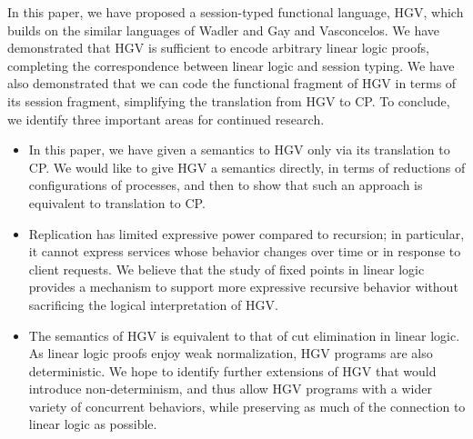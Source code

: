 \documentclass{easychair}
\newcommand{\key}{\mathsf}
\newcommand{\gvInputType}[2]{?[{#1}].{#2}}
\newcommand{\gvj}[3]{{#1} \vdash {#2} : {#3}}
\newcommand{\gvSendType}[2]{\key{sendType}~{#1}~{#2}}
\newcommand{\hgv}{HGV\xspace}
\begin{document}
In this paper, we have proposed a session-typed functional language, \hgv, which builds on the
similar languages of Wadler and Gay and Vasconcelos.  We have demonstrated that \hgv is sufficient
to encode arbitrary linear logic proofs, completing the correspondence between linear logic and
session typing.  We have also demonstrated that we can code the functional fragment of \hgv in terms
of its session fragment, simplifying the translation from \hgv to CP.  To conclude, we identify
three important areas for continued research.
\begin{itemize}
\item In this paper, we have given a semantics to \hgv only via its translation to CP.  We would
  like to give \hgv a semantics directly, in terms of reductions of configurations of processes, and
  then to show that such an approach is equivalent to translation to CP.
\item Replication has limited expressive power compared to recursion; in particular, it cannot
  express services whose behavior changes over time or in response to client requests.  We believe
  that the study of fixed points in linear logic provides a mechanism to support more expressive
  recursive behavior without sacrificing the logical interpretation of \hgv.
\item The semantics of \hgv is equivalent to that of cut elimination in linear logic.  As linear
  logic proofs enjoy weak normalization, \hgv programs are also deterministic.  We hope to identify
  further extensions of \hgv that would introduce non-determinism, and thus allow \hgv programs with
  a wider variety of concurrent behaviors, while preserving as much of the connection to linear
  logic as possible.
\end{itemize}





\label{sect:bib}

%
%
%


\appendix


\end{document}
